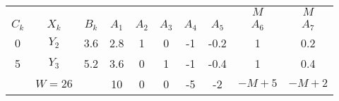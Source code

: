     \begin{tabular}{cccccccccc}
    \hline
    \hline
            &         &         &         &         &         &         &         & $M$     & $M$ \bigstrut[t]\\
    $C_k$   & $X_k$   & $B_k$   & $A_1$   & $A_2$   & $A_3$   & $A_4$   & $A_5$   & $A_6$   & $A_7$ \bigstrut[b]\\
    \hline
    0       & $Y_2$   & 3.6     & 2.8     & 1       & 0       & -1      & -0.2    & 1       & 0.2 \bigstrut[t]\\
    5       & $Y_3$   & 5.2     & 3.6     & 0       & 1       & -1      & -0.4    & 1       & 0.4 \bigstrut[b]\\
    \hline
            & $W=26$  &         & 10      & 0       & 0       & -5      & -2      & $-M+5$  & $-M+2$ \bigstrut\\
    \hline
    \hline
    \end{tabular}%
